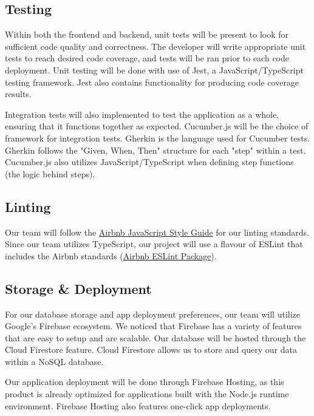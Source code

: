 \documentclass{article}
\begin{document}
\subsection{Testing}
Within both the frontend and backend, unit tests will be present to look for sufficient code quality and correctness. The developer will write appropriate unit tests to reach desired code coverage, and tests will be ran prior to each code deployment. Unit testing will be done with use of Jest, a JavaScript/TypeScript testing framework. Jest also contains functionality for producing code coverage results.

Integration tests will also implemented to test the application as a whole, ensuring that it functions together as expected. Cucumber.js will be the choice of framework for integration tests. Gherkin is the language used for Cucumber tests. Gherkin follows the "Given, When, Then" structure for each "step" within a test. Cucumber.js also utilizes JavaScript/TypeScript when defining step functions (the logic behind steps). 


\subsection{Linting}
Our team will follow the \href{https://github.com/airbnb/javascript}{Airbnb JavaScript Style Guide} for our linting standards. Since our team utilizes TypeScript, our project will use a flavour of ESLint that includes the Airbnb standards (\href{https://www.npmjs.com/package/eslint-config-airbnb-typescript}{Airbnb ESLint Package}).

\subsection{Storage \& Deployment}
For our database storage and app deployment preferences, our team will utilize Google's Firebase ecosystem. We noticed that Firebase has a variety of features that are easy to setup and are scalable. Our database will be hosted through the Cloud Firestore feature. Cloud Firestore allows us to store and query our data within a NoSQL database. 

Our application deployment will be done through Firebase Hosting, as this product is already optimized for applications built with the Node.js runtime environment. Firebase Hosting also features one-click app deployments.
\end{document}
